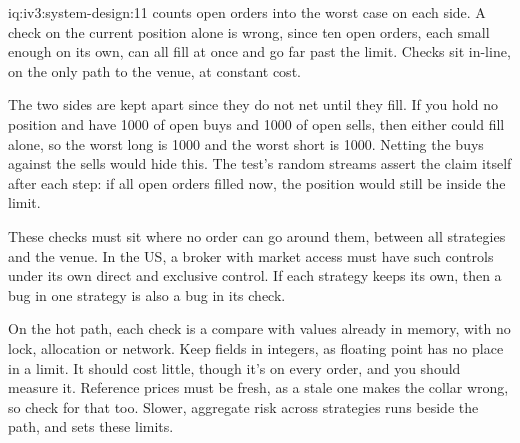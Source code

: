 \begin{solution}{iq:iv3:system-design:11}
 counts open orders into the worst case on each side. A check on the current position alone is wrong, since ten open orders, each small enough on its own, can all fill at once and go far past the limit. Checks sit in-line, on the only path to the venue, at constant cost.
\enlargethispage{-3\baselineskip}%
\label{lst:iv3:sd:risk}

The two sides are kept apart since they do not net until they fill. If you hold no position and have 1000 of open buys and 1000 of open sells, then either could fill alone, so the worst long is 1000 and the worst short is 1000. Netting the buys against the sells would hide this. The test's random streams assert the claim itself after each step: if all open orders filled now, the position would still be inside the limit.

These checks must sit where no order can go around them, between all strategies and the venue. In the US, a broker with market access must have such controls under its own direct and exclusive control. If each strategy keeps its own, then a bug in one strategy is also a bug in its check.

On the hot path, each check is a compare with values already in memory, with no lock, allocation or network. Keep fields in integers, as floating point has no place in a limit. It should cost little, though it's on every order, and you should measure it. Reference prices must be fresh, as a stale one makes the collar wrong, so check for that too. Slower, aggregate risk across strategies runs beside the path, and sets these limits.

\end{solution}


